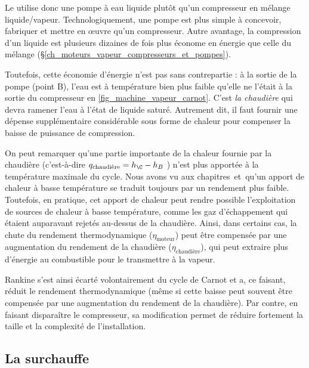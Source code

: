 		Le  utilise donc une pompe à eau liquide plutôt qu’un compresseur en mélange liquide/vapeur. Technologiquement, une pompe est plus simple à concevoir, fabriquer et mettre en œuvre qu’un compresseur. Autre avantage, la compression d’un liquide est plusieurs dizaines de fois plus économe en énergie que celle du mélange (\S\ref{ch_moteurs_vapeur_compresseurs_et_pompes}).
		
		Toutefois, cette économie d’énergie n’est pas sans contrepartie : à la sortie de la pompe (point B), l’eau est à température bien plus faible qu’elle ne l’était à la sortie du compresseur en \cref{fig_machine_vapeur_carnot}. C’est \emph{la chaudière} qui devra ramener l’eau à l’état de liquide saturé. Autrement dit, il faut fournir une dépense supplémentaire considérable sous forme de chaleur pour compenser la baisse de puissance de compression.

		On peut remarquer qu’une partie importante de la chaleur fournie par la chaudière (c’est-à-dire $q_\text{chaudière} = h_\C - h_B$ ) n’est plus apportée à la température maximale du cycle. Nous avons vu aux chapitres~\sept et~\huit qu’un apport de chaleur à basse température se traduit toujours par un rendement plus faible.\\
		Toutefois, en pratique, cet apport de chaleur peut rendre possible l’exploitation de sources de chaleur à basse température, comme les gaz d’échappement qui étaient auparavant rejetés au-dessus de la chaudière. Ainsi, dans certains cas, la chute du rendement thermodynamique ($\eta_\text{moteur}$) peut être compensée par une augmentation du rendement de la chaudière ($\eta_\text{chaudière}$), qui peut extraire plus d’énergie au combustible pour le transmettre à la vapeur.
		
		Rankine s’est ainsi écarté volontairement du cycle de Carnot et a, ce faisant, réduit le rendement thermodynamique (même si cette baisse peut souvent être compensée par une augmentation du rendement de la chaudière). Par contre, en faisant disparaître le compresseur, sa modification permet de réduire fortement la taille et la complexité de l’installation.

		

	\subsection{La surchauffe}

